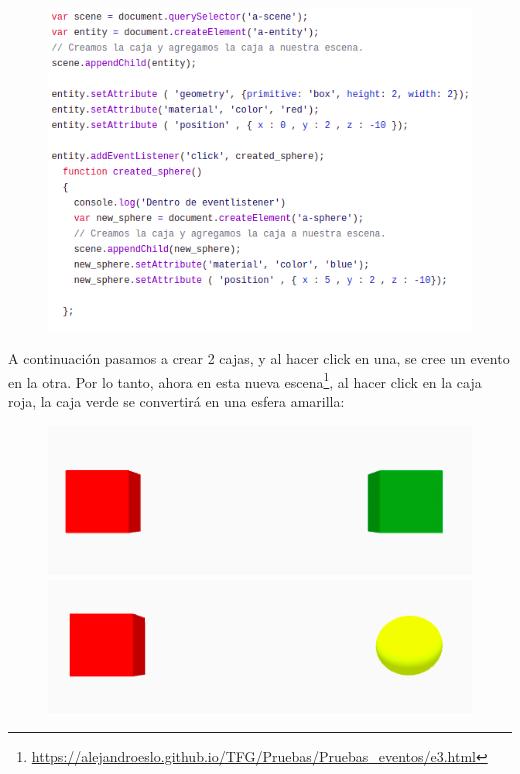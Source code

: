 \documentclass[a4paper, 12pt]{book}
\begin{document}
\begin{figure}[h]
\centering
 \includegraphics[scale=0.75]{img/code1-1.png}
\end{figure}

\newpage
A continuación pasamos a crear 2 cajas, y al hacer click en una, se cree un evento en la otra. Por lo tanto, ahora en esta nueva escena\footnote{\url{https://alejandroeslo.github.io/TFG/Pruebas/Pruebas_eventos/e3.html}}, al hacer click en la caja roja, la caja verde se convertirá en una esfera amarilla:

\begin{figure}[h]
\centering
    \includegraphics[scale=0.5]{img/escena1_2a.png}
    \includegraphics[scale=0.5]{img/escena1_2b.png}
\end{figure}
\end{document}
